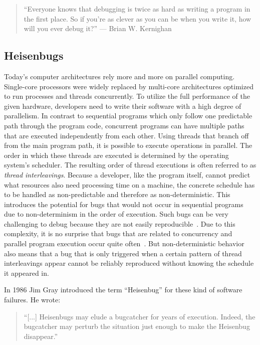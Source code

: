\documentclass[conference]{IEEEtran}
\begin{document}
\begin{quote}
``Everyone knows that debugging is twice as hard as writing a program in the first place. So if you're as clever as you can be when you write it, how will you ever debug it?'' --- Brian W. Kernighan\cite{kernighan1974elements}
\end{quote}

\subsection{Heisenbugs}

Today's computer architectures rely more and more on parallel computing.
Single-core processors were widely replaced by multi-core architectures optimized to run processes and threads concurrently.
To utilize the full performance of the given hardware, developers need to write their software with a high degree of parallelism.
In contrast to sequential programs which only follow one predictable path through the program code, concurrent programs can have multiple paths that are executed independently from each other.
Using threads that branch off from the main program path, it is possible to execute operations in parallel.
The order in which these threads are executed is determined by the operating system's scheduler.
The resulting order of thread executions is often referred to as \emph{thread interleavings}.
Because a developer, like the program itself, cannot predict what resources also need processing time on a machine, the concrete schedule has to be handled as non-predictable and therefore as non-deterministic.
This introduces the potential for bugs that would not occur in sequential programs due to non-determinism in the order of execution.
Such bugs can be very challenging to debug because they are not easily reproducible~\cite{tu2019go}.
Due to this complexity, it is no surprise that bugs that are related to concurrency and parallel program execution occur quite often~\cite{lu2008mistakes}.
But non-deterministic behavior also means that a bug that is only triggered when a certain pattern of thread interleavings appear cannot be reliably reproduced without knowing the schedule it appeared in.

In 1986 Jim Gray introduced the term ``Heisenbug'' for these kind of software failures.
He wrote:

\begin{quote}
``[...] Heisenbugs may elude a bugcatcher for years of execution. Indeed, the bugcatcher may perturb the situation just enough to make the Heisenbug disappear.''\cite{gray1986computers}
\end{quote}
\end{document}
